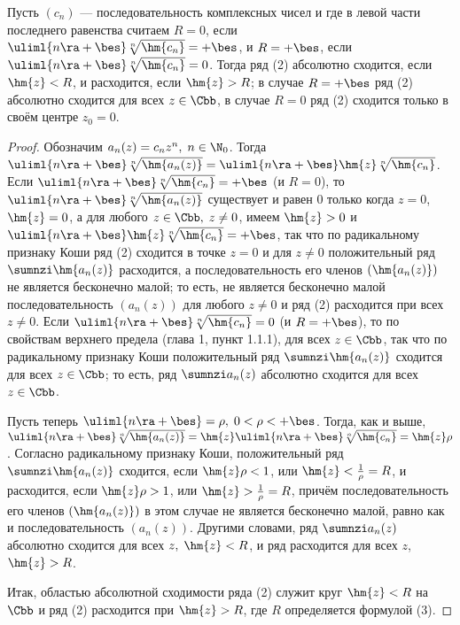 \documentclass[a4paper]{article}
\begin{document}
\begin{theorem}
Пусть $(c_n)$ --- последовательность комплексных чисел и
 где в левой части последнего равенства считаем
$R=0$, если $\uliml{n\ra+\bes} \sqrt[n]{\hm{c_n}}=+\bes$, и
$R=+\bes$, если $\uliml{n\ra+\bes} \sqrt[n]{\hm{c_n}}=0$. Тогда ряд
(2) абсолютно сходится, если $\hm{z}<R$, и расходится, если
$\hm{z}>R$; в случае $R=+\bes$ ряд (2) абсолютно сходится для всех
$z\in\Cbb$, в случае $R=0$ ряд (2) сходится только в своём центре
$z_0=0$.
\end{theorem}

\begin{proof}
Обозначим $a_n(z) = c_nz^n, \; n\in\N_0$. Тогда $\uliml{n\ra+\bes}
\sqrt[n]{\hm{a_n(z)}} = \uliml{n\ra+\bes} \hm{z}
\sqrt[n]{\hm{c_n}}$. Если $\uliml{n\ra+\bes} \sqrt[n]{\hm{c_n}} =
+\bes$ (и $R=0$), то $\uliml{n\ra+\bes} \sqrt[n]{\hm{a_n(z)}}$
существует и равен $0$ только когда $z=0$, $\hm{z}=0$, а для любого
$z\in\Cbb, \; z\ne0$, имеем $\hm{z}>0$ и $\uliml{n\ra+\bes} \hm{z}
\sqrt[n]{\hm{c_n}}=+\bes$, так что по радикальному признаку Коши ряд
(2) сходится в точке $z=0$ и для $z\ne0$ положительный ряд $\sumnzi
\hm{a_n(z)}$ расходится, а последовательность его членов
$(\hm{a_n(z)})$ не является бесконечно малой; то есть, не является
бесконечно малой последовательность $(a_n(z))$ для любого $z\ne0$ и
ряд (2) расходится при всех $z\ne0$. Если $\uliml{n\ra+\bes}
\sqrt[n]{\hm{c_n}}=0$ (и $R=+\bes$), то по свойствам верхнего
предела (глава 1, пункт 1.1.1),  для всех
$z\in\Cbb$, так что по радикальному признаку Коши положительный ряд
$\sumnzi \hm{a_n(z)}$ сходится для всех $z\in\Cbb$; то есть, ряд
$\sumnzi a_n(z)$ абсолютно сходится для всех $z\in\Cbb$.

Пусть теперь $\uliml{n\ra+\bes}=\rho, \; 0<\rho<+\bes$. Тогда, как и
выше, $\uliml{n\ra+\bes} \sqrt[n]{\hm{a_n(z)}}=\hm{z}
\uliml{n\ra+\bes} \sqrt[n]{\hm{c_n}} = \hm{z}\rho$. Согласно
радикальному признаку Коши, положительный ряд $\sumnzi \hm{a_n(z)}$
сходится, если $\hm{z}\rho<1$, или $\hm{z} < \frac1{\rho}=R$, и
расходится, если $\hm{z}\rho>1$, или $\hm{z} > \frac1{\rho}=R$,
причём последовательность его членов $(\hm{a_n(z)})$ в этом случае
не является бесконечно малой, равно как и последовательность
$(a_n(z))$. Другими словами, ряд $\sumnzi a_n(z)$ абсолютно сходится
для всех $z, \; \hm{z}<R$, и ряд расходится для всех $z$,
$\hm{z}>R$.

Итак, областью абсолютной сходимости ряда (2) служит круг $\hm{z}<R$
на $\Cbb$ и ряд (2) расходится при $\hm{z}>R$, где $R$ определяется
формулой (3).
\end{proof}
\end{document}
